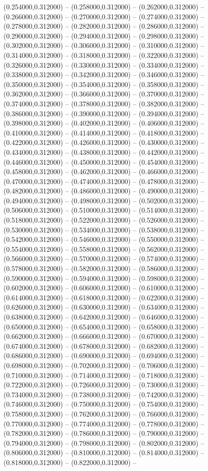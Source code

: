    (0.254000,0.312000) -- (0.258000,0.312000) -- (0.262000,0.312000) -- (0.266000,0.312000) -- (0.270000,0.312000) -- (0.274000,0.312000) -- (0.278000,0.312000) -- (0.282000,0.312000) -- (0.286000,0.312000) -- (0.290000,0.312000) -- (0.294000,0.312000) -- (0.298000,0.312000) -- (0.302000,0.312000) -- (0.306000,0.312000) -- (0.310000,0.312000) -- (0.314000,0.312000) -- (0.318000,0.312000) -- (0.322000,0.312000) -- (0.326000,0.312000) -- (0.330000,0.312000) -- (0.334000,0.312000) -- (0.338000,0.312000) -- (0.342000,0.312000) -- (0.346000,0.312000) -- (0.350000,0.312000) -- (0.354000,0.312000) -- (0.358000,0.312000) -- (0.362000,0.312000) -- (0.366000,0.312000) -- (0.370000,0.312000) -- (0.374000,0.312000) -- (0.378000,0.312000) -- (0.382000,0.312000) -- (0.386000,0.312000) -- (0.390000,0.312000) -- (0.394000,0.312000) -- (0.398000,0.312000) -- (0.402000,0.312000) -- (0.406000,0.312000) -- (0.410000,0.312000) -- (0.414000,0.312000) -- (0.418000,0.312000) -- (0.422000,0.312000) -- (0.426000,0.312000) -- (0.430000,0.312000) -- (0.434000,0.312000) -- (0.438000,0.312000) -- (0.442000,0.312000) -- (0.446000,0.312000) -- (0.450000,0.312000) -- (0.454000,0.312000) -- (0.458000,0.312000) -- (0.462000,0.312000) -- (0.466000,0.312000) -- (0.470000,0.312000) -- (0.474000,0.312000) -- (0.478000,0.312000) -- (0.482000,0.312000) -- (0.486000,0.312000) -- (0.490000,0.312000) -- (0.494000,0.312000) -- (0.498000,0.312000) -- (0.502000,0.312000) -- (0.506000,0.312000) -- (0.510000,0.312000) -- (0.514000,0.312000) -- (0.518000,0.312000) -- (0.522000,0.312000) -- (0.526000,0.312000) -- (0.530000,0.312000) -- (0.534000,0.312000) -- (0.538000,0.312000) -- (0.542000,0.312000) -- (0.546000,0.312000) -- (0.550000,0.312000) -- (0.554000,0.312000) -- (0.558000,0.312000) -- (0.562000,0.312000) -- (0.566000,0.312000) -- (0.570000,0.312000) -- (0.574000,0.312000) -- (0.578000,0.312000) -- (0.582000,0.312000) -- (0.586000,0.312000) -- (0.590000,0.312000) -- (0.594000,0.312000) -- (0.598000,0.312000) -- (0.602000,0.312000) -- (0.606000,0.312000) -- (0.610000,0.312000) -- (0.614000,0.312000) -- (0.618000,0.312000) -- (0.622000,0.312000) -- (0.626000,0.312000) -- (0.630000,0.312000) -- (0.634000,0.312000) -- (0.638000,0.312000) -- (0.642000,0.312000) -- (0.646000,0.312000) -- (0.650000,0.312000) -- (0.654000,0.312000) -- (0.658000,0.312000) -- (0.662000,0.312000) -- (0.666000,0.312000) -- (0.670000,0.312000) -- (0.674000,0.312000) -- (0.678000,0.312000) -- (0.682000,0.312000) -- (0.686000,0.312000) -- (0.690000,0.312000) -- (0.694000,0.312000) -- (0.698000,0.312000) -- (0.702000,0.312000) -- (0.706000,0.312000) -- (0.710000,0.312000) -- (0.714000,0.312000) -- (0.718000,0.312000) -- (0.722000,0.312000) -- (0.726000,0.312000) -- (0.730000,0.312000) -- (0.734000,0.312000) -- (0.738000,0.312000) -- (0.742000,0.312000) -- (0.746000,0.312000) -- (0.750000,0.312000) -- (0.754000,0.312000) -- (0.758000,0.312000) -- (0.762000,0.312000) -- (0.766000,0.312000) -- (0.770000,0.312000) -- (0.774000,0.312000) -- (0.778000,0.312000) -- (0.782000,0.312000) -- (0.786000,0.312000) -- (0.790000,0.312000) -- (0.794000,0.312000) -- (0.798000,0.312000) -- (0.802000,0.312000) -- (0.806000,0.312000) -- (0.810000,0.312000) -- (0.814000,0.312000) -- (0.818000,0.312000) -- (0.822000,0.312000) -- 